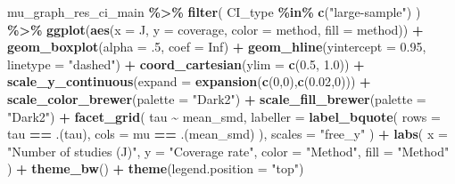 \documentclass[
]{article}
\newenvironment{Shaded}{\begin{snugshade}}{\end{snugshade}}
\newcommand{\AttributeTok}[1]{\textcolor[rgb]{0.13,0.29,0.53}{#1}}
\newcommand{\ConstantTok}[1]{\textcolor[rgb]{0.56,0.35,0.01}{#1}}
\newcommand{\DecValTok}[1]{\textcolor[rgb]{0.00,0.00,0.81}{#1}}
\newcommand{\FloatTok}[1]{\textcolor[rgb]{0.00,0.00,0.81}{#1}}
\newcommand{\FunctionTok}[1]{\textcolor[rgb]{0.13,0.29,0.53}{\textbf{#1}}}
\newcommand{\NormalTok}[1]{#1}
\newcommand{\SpecialCharTok}[1]{\textcolor[rgb]{0.81,0.36,0.00}{\textbf{#1}}}
\newcommand{\StringTok}[1]{\textcolor[rgb]{0.31,0.60,0.02}{#1}}
\begin{document}
\begin{Shaded}
\begin{Highlighting}[]
\NormalTok{mu\_graph\_res\_ci\_main }\SpecialCharTok{\%\textgreater{}\%}
  \FunctionTok{filter}\NormalTok{(}
\NormalTok{    CI\_type }\SpecialCharTok{\%in\%} \FunctionTok{c}\NormalTok{(}\StringTok{"large{-}sample"}\NormalTok{)}
\NormalTok{  ) }\SpecialCharTok{\%\textgreater{}\%}
  \FunctionTok{ggplot}\NormalTok{(}\FunctionTok{aes}\NormalTok{(}\AttributeTok{x =}\NormalTok{ J, }\AttributeTok{y =}\NormalTok{ coverage, }\AttributeTok{color =}\NormalTok{ method, }\AttributeTok{fill =}\NormalTok{ method)) }\SpecialCharTok{+}
  \FunctionTok{geom\_boxplot}\NormalTok{(}\AttributeTok{alpha =}\NormalTok{ .}\DecValTok{5}\NormalTok{, }\AttributeTok{coef =} \ConstantTok{Inf}\NormalTok{) }\SpecialCharTok{+}
  \FunctionTok{geom\_hline}\NormalTok{(}\AttributeTok{yintercept =} \FloatTok{0.95}\NormalTok{, }\AttributeTok{linetype =} \StringTok{"dashed"}\NormalTok{) }\SpecialCharTok{+}
  \FunctionTok{coord\_cartesian}\NormalTok{(}\AttributeTok{ylim =} \FunctionTok{c}\NormalTok{(}\FloatTok{0.5}\NormalTok{, }\FloatTok{1.0}\NormalTok{)) }\SpecialCharTok{+} 
  \FunctionTok{scale\_y\_continuous}\NormalTok{(}\AttributeTok{expand =} \FunctionTok{expansion}\NormalTok{(}\FunctionTok{c}\NormalTok{(}\DecValTok{0}\NormalTok{,}\DecValTok{0}\NormalTok{),}\FunctionTok{c}\NormalTok{(}\FloatTok{0.02}\NormalTok{,}\DecValTok{0}\NormalTok{))) }\SpecialCharTok{+} 
  \FunctionTok{scale\_color\_brewer}\NormalTok{(}\AttributeTok{palette =} \StringTok{"Dark2"}\NormalTok{) }\SpecialCharTok{+}
  \FunctionTok{scale\_fill\_brewer}\NormalTok{(}\AttributeTok{palette =} \StringTok{"Dark2"}\NormalTok{) }\SpecialCharTok{+}
  \FunctionTok{facet\_grid}\NormalTok{(}
\NormalTok{    tau }\SpecialCharTok{\textasciitilde{}}\NormalTok{ mean\_smd, }
    \AttributeTok{labeller =} \FunctionTok{label\_bquote}\NormalTok{(}
      \AttributeTok{rows =}\NormalTok{ tau }\SpecialCharTok{==}\NormalTok{ .(tau),}
      \AttributeTok{cols =}\NormalTok{ mu }\SpecialCharTok{==}\NormalTok{ .(mean\_smd)}
\NormalTok{    ),}
    \AttributeTok{scales =} \StringTok{"free\_y"}
\NormalTok{  ) }\SpecialCharTok{+}
  \FunctionTok{labs}\NormalTok{(}
    \AttributeTok{x =} \StringTok{"Number of studies (J)"}\NormalTok{, }
    \AttributeTok{y =} \StringTok{"Coverage rate"}\NormalTok{, }
    \AttributeTok{color =} \StringTok{"Method"}\NormalTok{,}
    \AttributeTok{fill =} \StringTok{"Method"}
\NormalTok{  ) }\SpecialCharTok{+} 
  \FunctionTok{theme\_bw}\NormalTok{() }\SpecialCharTok{+}
  \FunctionTok{theme}\NormalTok{(}\AttributeTok{legend.position =} \StringTok{"top"}\NormalTok{)}
\end{Highlighting}
\end{Shaded}
\end{document}
